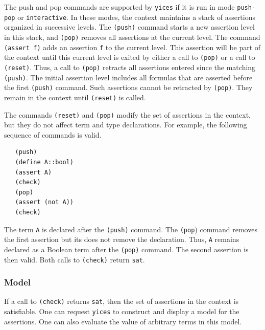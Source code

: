 \documentclass[11pt,twoside,fleqn,openright,titlepage]{cslreport}
\begin{document}
\medskip\noindent
The push and pop commands are supported by \texttt{yices} if it is run
in mode \texttt{push-pop} or \texttt{interactive}. In these modes, the
context maintains a stack of assertions organized in successive
levels. The \texttt{(push)} command starts a new assertion level in
this stack, and \texttt{(pop)} removes all assertions at the current
level. The command \texttt{(assert f)} adds an assertion \texttt{f} to
the current level. This assertion will be part of the context until
this current level is exited by either a call to \texttt{(pop)} or a
call to \texttt{(reset)}. Thus, a call to \texttt{(pop)} retracts all
assertions entered since the matching \texttt{(push)}.  The initial
assertion level includes all formulas that are asserted before the
first \texttt{(push)} command. Such assertions cannot be retracted by
\texttt{(pop)}. They remain in the context until \texttt{(reset)} is
called.

\medskip\noindent
The commands \texttt{(reset)} and \texttt{(pop)} modify the set of
assertions in the context, but they do not affect term and type
declarations. For example, the following sequence of commands is
valid.
\begin{small}
\begin{verbatim}
   (push)
   (define A::bool)
   (assert A)
   (check)
   (pop)
   (assert (not A))
   (check)
\end{verbatim}
\end{small}
The term \texttt{A} is declared after the \texttt{(push)} command. The
\texttt{(pop}) command removes the first assertion but its does not
remove the declaration. Thus, \texttt{A} remains declared as a Boolean
term after the \texttt{(pop)} command. The second assertion is then
valid. Both calls to \texttt{(check)} return \texttt{sat}.


\subsubsection*{Model}

If a call to \texttt{(check)} returns \texttt{sat}, then the set of
assertions in the context is satisfiable. One can request
\texttt{yices} to construct and display a model for the
assertions. One can also evaluate the value of arbitrary terms in this
model.
\end{document}
